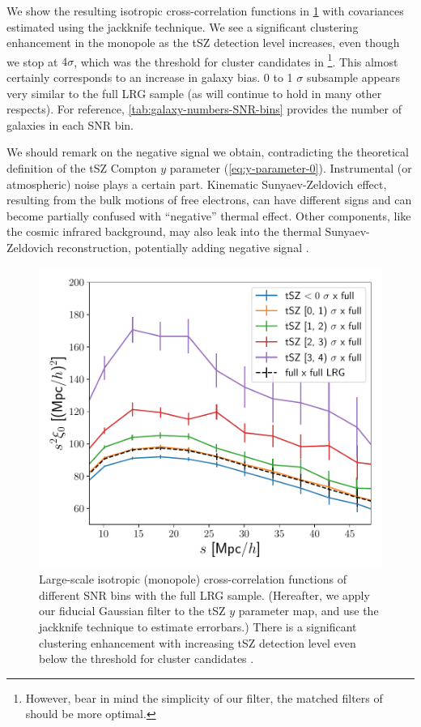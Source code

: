 We show the resulting isotropic cross-correlation functions in \cref{fig:clustering-SNR-bins} with covariances estimated using the jackknife technique.
We see a significant clustering enhancement in the monopole as the tSZ detection level increases, even though we stop at $4\sigma$, which was the threshold for cluster candidates in \cite{ACT-SZ-clusters-DR5}\footnote{However, bear in mind the simplicity of our filter, the matched filters of \cite{ACT-SZ-clusters-DR5} should be more optimal.}.
This almost certainly corresponds to an increase in galaxy bias.
0 to 1 $\sigma$ subsample appears very similar to the full LRG sample (as will continue to hold in many other respects).
For reference, \cref{tab:galaxy-numbers-SNR-bins} provides the number of galaxies in each SNR bin.

We should remark on the negative signal we obtain, contradicting the theoretical definition of the tSZ Compton $y$ parameter (\cref{eq:y-parameter-0}).
Instrumental (or atmospheric) noise plays a certain part.
Kinematic Sunyaev-Zeldovich effect, resulting from the bulk motions of free electrons, can have different signs and can become partially confused with ``negative'' thermal effect.
Other components, like the cosmic infrared background, may also leak into the thermal Sunyaev-Zeldovich reconstruction, potentially adding negative signal \citep{ACT-maps-DR6}.

\begin{figure}[htbp]
    \centering
    \includegraphics[width=\linewidth]{fig/LRG-z0.4-0.85-SZ-ACTPlanck-filtered2.4-monopole-jack-errorbars-clean.pdf}
    \caption[Large-scale cross-correlation functions of different tSZ SNR bins with the full LRG sample]{Large-scale isotropic (monopole) cross-correlation functions of different SNR bins with the full LRG sample.
    (Hereafter, we apply our fiducial Gaussian filter to the tSZ $y$ parameter map, and use the jackknife technique to estimate errorbars.)
    There is a significant clustering enhancement with increasing tSZ detection level even below the threshold for cluster candidates \citep[$4\sigma$ in][]{ACT-SZ-clusters-DR5}.}
    \label{fig:clustering-SNR-bins}
\end{figure}

